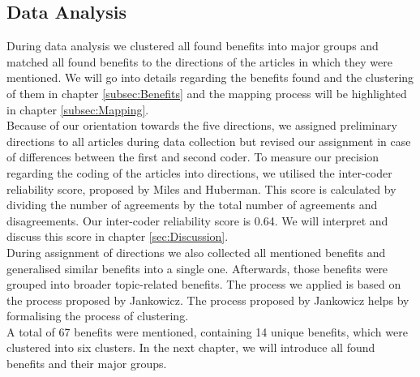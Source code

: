 \subsection{Data Analysis}
During data analysis we clustered all found benefits into major groups and matched all found benefits to the directions of the articles in which they were mentioned. We will go into details regarding the benefits found and the clustering of them in chapter \ref{subsec:Benefits} and the mapping process will be highlighted in chapter \ref{subsec:Mapping}.\\
Because of our orientation towards the five directions, we assigned preliminary directions to all articles during data collection but revised our assignment in case of differences between the first and second coder. To measure our precision regarding the coding of the articles into directions, we utilised the inter-coder reliability score, proposed by Miles and Huberman.\autocite[cf.][46]{Miles.1994} This score is calculated by dividing the number of agreements by the total number of agreements and disagreements. Our inter-coder reliability score is 0.64. We will interpret and discuss this score in chapter \ref{sec:Discussion}. \\
During assignment of directions we also collected all mentioned benefits and generalised similar benefits into a single one. Afterwards, those benefits were grouped into broader topic-related benefits. The process we applied is based on the process proposed by Jankowicz.\autocite[cf.][149]{Jankowicz.2004} The process proposed by Jankowicz helps by formalising the process of clustering.\\
A total of 67 benefits were mentioned, containing 14 unique benefits, which were clustered into six clusters. In the next chapter, we will introduce all found benefits and their major groups.